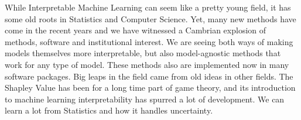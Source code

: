 \documentclass[runningheads]{llncs}
\begin{document}
While Interpretable Machine Learning can seem like a pretty young field, it has some old roots in Statistics and Computer Science.
Yet, many new methods have come in the recent years and we have witnessed a Cambrian explosion of methods, software and institutional interest.
We are seeing both ways of making models themselves more interpretable, but also model-agnostic methods that work for any type of model.
These methods also are implemented now in many software packages.
Big leaps in the field came from old ideas in other fields.
The Shapley Value has been for a long time part of game theory, and its introduction to machine learning interpretability has spurred a lot of development.
We can learn a lot from Statistics and how it handles uncertainty.

%
%
%
% 
%

\vskip 0.2in


\end{document}
